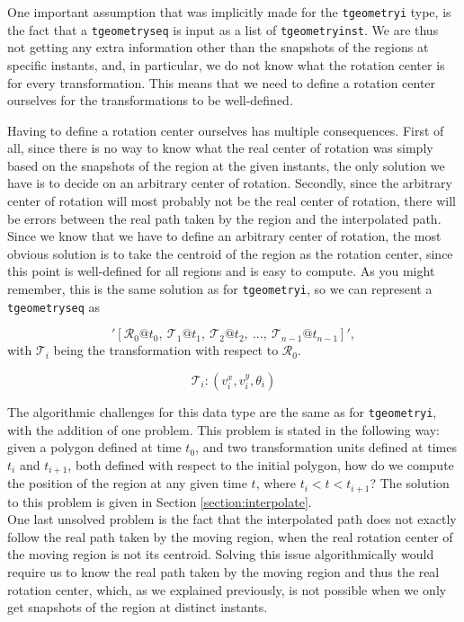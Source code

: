 One important assumption that was implicitly made for the \lstinline{tgeometryi} type, is the fact that a \lstinline{tgeometryseq} is input as a list of \lstinline+tgeometryinst+. We are thus not getting any extra information other than the snapshots of the regions at specific instants, and, in particular, we do not know what the rotation center is for every transformation. This means that we need to define a rotation center ourselves for the transformations to be well-defined.

Having to define a rotation center ourselves has multiple consequences. First of all, since there is no way to know what the real center of rotation was simply based on the snapshots of the region at the given instants, the only solution we have is to decide on an arbitrary center of rotation. Secondly, since the arbitrary center of rotation will most probably not be the real center of rotation, there will be errors between the real path taken by the region and the interpolated path. \\

Since we know that we have to define an arbitrary center of rotation, the most obvious solution is to take the centroid of the region as the rotation center, since this point is well-defined for all regions and is easy to compute. As you might remember, this is the same solution as for \lstinline{tgeometryi}, so we can represent a \lstinline{tgeometryseq} as 

\[
    '[\mathcal{R}_0@t_0,\ \mathcal{T}_1@t_1,\ \mathcal{T}_2@t_2,\ ..., \ \mathcal{T}_{n-1}@t_{n-1}]', 
\]
with $\mathcal{T}_i$ being the transformation with respect to $\mathcal{R}_0$.

\[
    \mathcal{T}_i: (v_i^x, v_i^y, \theta_i)
\]

The algorithmic challenges for this data type are the same as for \lstinline{tgeometryi}, with the addition of one problem. This problem is stated in the following way: given a polygon defined at time $t_0$, and two transformation units defined at times $t_i$ and $t_{i+1}$, both defined with respect to the initial polygon, how do we compute the position of the region at any given time $t$, where $t_i < t < t_{i+1}$? The solution to this problem is given in Section \ref{section:interpolate}. \\

One last unsolved problem is the fact that the interpolated path does not exactly follow the real path taken by the moving region, when the real rotation center of the moving region is not its centroid. Solving this issue algorithmically would require us to know the real path taken by the moving region and thus the real rotation center, which, as we explained previously, is not possible when we only get snapshots of the region at distinct instants. 


